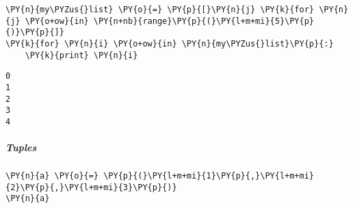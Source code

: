 {\par%
\vspace{-1\baselineskip}%
}%
\begin{notebookcell}[4]%
\begin{addmargin}[\cellleftmargin]{0em}%
{\smaller%
\par%
%
\vspace{-1\smallerfontscale}%
\begin{Verbatim}[commandchars=\\\{\}]
\PY{n}{my\PYZus{}list} \PY{o}{=} \PY{p}{[}\PY{n}{j} \PY{k}{for} \PY{n}{j} \PY{o+ow}{in} \PY{n+nb}{range}\PY{p}{(}\PY{l+m+mi}{5}\PY{p}{)}\PY{p}{]}
\PY{k}{for} \PY{n}{i} \PY{o+ow}{in} \PY{n}{my\PYZus{}list}\PY{p}{:}
    \PY{k}{print} \PY{n}{i}
\end{Verbatim}
%
\par%
\vspace{-1\smallerfontscale}}%
\end{addmargin}
\end{notebookcell}

\par\vspace{1\smallerfontscale}%
    \begin{addmargin}[\cellleftmargin]{0em}%
    {\smaller%
    \vspace{-1\smallerfontscale}%
    
    \begin{Verbatim}[commandchars=\\\{\}]
0
1
2
3
4
    \end{Verbatim}
}%
    \end{addmargin}%

    \subparagraph{Tuples}



{\par%
\vspace{-1\baselineskip}%
}%
\begin{notebookcell}[9]%
\begin{addmargin}[\cellleftmargin]{0em}%
{\smaller%
\par%
%
\vspace{-1\smallerfontscale}%
\begin{Verbatim}[commandchars=\\\{\}]
\PY{n}{a} \PY{o}{=} \PY{p}{(}\PY{l+m+mi}{1}\PY{p}{,}\PY{l+m+mi}{2}\PY{p}{,}\PY{l+m+mi}{3}\PY{p}{)}
\PY{n}{a}
\end{Verbatim}
%
\par%
\vspace{-1\smallerfontscale}}%
\end{addmargin}
\end{notebookcell}

